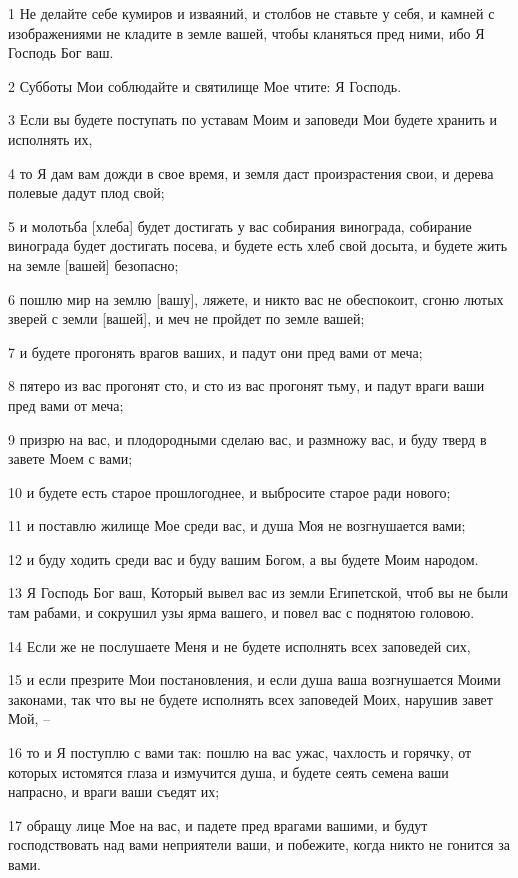 \par 1 Не делайте себе кумиров и изваяний, и столбов не ставьте у себя, и камней с изображениями не кладите в земле вашей, чтобы кланяться пред ними, ибо Я Господь Бог ваш.
\par 2 Субботы Мои соблюдайте и святилище Мое чтите: Я Господь.
\par 3 Если вы будете поступать по уставам Моим и заповеди Мои будете хранить и исполнять их,
\par 4 то Я дам вам дожди в свое время, и земля даст произрастения свои, и дерева полевые дадут плод свой;
\par 5 и молотьба [хлеба] будет достигать у вас собирания винограда, собирание винограда будет достигать посева, и будете есть хлеб свой досыта, и будете жить на земле [вашей] безопасно;
\par 6 пошлю мир на землю [вашу], ляжете, и никто вас не обеспокоит, сгоню лютых зверей с земли [вашей], и меч не пройдет по земле вашей;
\par 7 и будете прогонять врагов ваших, и падут они пред вами от меча;
\par 8 пятеро из вас прогонят сто, и сто из вас прогонят тьму, и падут враги ваши пред вами от меча;
\par 9 призрю на вас, и плодородными сделаю вас, и размножу вас, и буду тверд в завете Моем с вами;
\par 10 и будете есть старое прошлогоднее, и выбросите старое ради нового;
\par 11 и поставлю жилище Мое среди вас, и душа Моя не возгнушается вами;
\par 12 и буду ходить среди вас и буду вашим Богом, а вы будете Моим народом.
\par 13 Я Господь Бог ваш, Который вывел вас из земли Египетской, чтоб вы не были там рабами, и сокрушил узы ярма вашего, и повел вас с поднятою головою.
\par 14 Если же не послушаете Меня и не будете исполнять всех заповедей сих,
\par 15 и если презрите Мои постановления, и если душа ваша возгнушается Моими законами, так что вы не будете исполнять всех заповедей Моих, нарушив завет Мой, --
\par 16 то и Я поступлю с вами так: пошлю на вас ужас, чахлость и горячку, от которых истомятся глаза и измучится душа, и будете сеять семена ваши напрасно, и враги ваши съедят их;
\par 17 обращу лице Мое на вас, и падете пред врагами вашими, и будут господствовать над вами неприятели ваши, и побежите, когда никто не гонится за вами.
